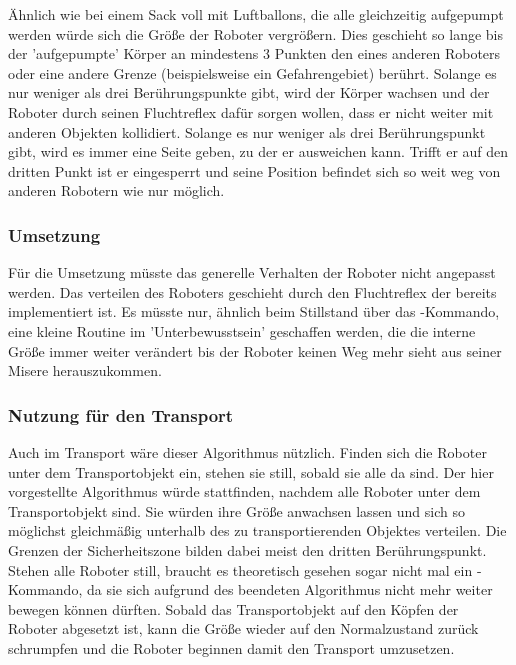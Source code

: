 Ähnlich wie bei einem Sack voll mit Luftballons, die alle gleichzeitig aufgepumpt werden würde sich die Größe der Roboter vergrößern. Dies geschieht so lange bis der 'aufgepumpte' Körper an mindestens 3 Punkten den eines anderen Roboters oder eine andere Grenze (beispielsweise ein Gefahrengebiet) berührt. Solange es nur weniger als drei Berührungspunkte gibt, wird der Körper wachsen und der Roboter durch seinen Fluchtreflex dafür sorgen wollen, dass er nicht weiter mit anderen Objekten kollidiert. Solange es nur weniger als drei Berührungspunkt gibt, wird es immer eine Seite geben, zu der er ausweichen kann. Trifft er auf den dritten Punkt ist er eingesperrt und seine Position befindet sich so weit weg von anderen Robotern wie nur möglich.

\subsubsection*{Umsetzung}
Für die Umsetzung müsste das generelle Verhalten der Roboter nicht angepasst werden. Das verteilen des Roboters geschieht durch den Fluchtreflex der bereits implementiert ist. Es müsste nur, ähnlich beim Stillstand über das -Kommando, eine kleine Routine im 'Unterbewusstsein' geschaffen werden, die die interne Größe immer weiter verändert bis der Roboter keinen Weg mehr sieht aus seiner Misere herauszukommen.

\subsubsection*{Nutzung für den Transport}
Auch im Transport wäre dieser Algorithmus nützlich. Finden sich die Roboter unter dem Transportobjekt ein, stehen sie still, sobald sie alle da sind. Der hier vorgestellte Algorithmus würde stattfinden, nachdem alle Roboter unter dem Transportobjekt sind. Sie würden ihre Größe anwachsen lassen und sich so möglichst gleichmäßig unterhalb des zu transportierenden Objektes verteilen. Die Grenzen der Sicherheitszone bilden dabei meist den dritten Berührungspunkt. Stehen alle Roboter still, braucht es theoretisch gesehen sogar nicht mal ein -Kommando, da sie sich aufgrund des beendeten Algorithmus nicht mehr weiter bewegen können dürften.
Sobald das Transportobjekt auf den Köpfen der Roboter abgesetzt ist, kann die Größe wieder auf den Normalzustand zurück schrumpfen und die Roboter beginnen damit den Transport umzusetzen.